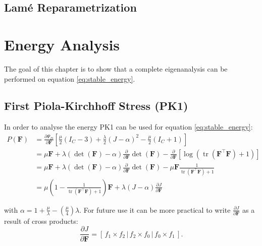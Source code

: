
\subsection{Lamé Reparametrization}


\section{Energy Analysis}
The goal of this chapter is to show that a complete eigenanalysis can be performed on equation \ref{eq:stable_energy}.


\subsection{First Piola-Kirchhoff Stress (PK1)}
In order to analyse the energy PK1 can be used for equation \ref{eq:stable_energy}:
\begin{align*}
P(\mathbf{F}) &= \frac{\partial \Psi_{D}}{\partial \mathbf{F}} \left[ \frac{\mu}{2}\left(I_{C}-3\right) + \frac{\lambda}{2}(J-\alpha)^{2} - \frac{\mu}{2}\left(I_{C}+1\right) \right] \\
&= \mu \mathbf{F} + \lambda (\operatorname{det}(\mathbf{F})-\alpha)  \frac{\partial}{\partial \mathbf{F}} \operatorname{det}(\mathbf{F}) - \frac{\partial}{\partial \mathbf{F}} \left[\operatorname{log}\left(\operatorname{tr}(\mathbf{F}^\intercal \mathbf{F})+1\right)\right] \\
&= \mu \mathbf{F} + \lambda (\operatorname{det}(\mathbf{F})-\alpha)  \frac{\partial}{\partial \mathbf{F}} \operatorname{det}(\mathbf{F}) - \mu \mathbf{F} \frac{1}{\operatorname{tr}(\mathbf{F}^\intercal \mathbf{F}) + 1} \\
&= \mu \left( 1 - \frac{1}{\operatorname{tr}(\mathbf{F}^\intercal \mathbf{F}) + 1}\right) \mathbf{F} + \lambda(J-\alpha)\frac{\partial J}{\partial \mathbf{F}}
\end{align*}

with $\alpha=1+\frac{\mu}{\lambda}-\left(\frac{\mu}{4}\right)\lambda$. For future use it can be more practical to write $\frac{\partial J}{\partial \mathbf{F}}$ as a result of cross products:
\begin{equation}\label{eq:cross_product}
\frac{\partial J}{\partial \mathbf{F}} = \left[ \,f_1 \times f_2\, \bigg| \,f_2 \times f_0\, \bigg| \,f_0 \times f_1\, \right].
\end{equation}

